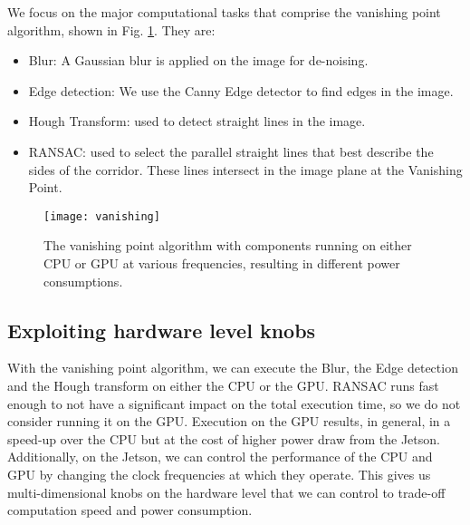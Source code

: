 We focus on the major computational tasks that comprise the vanishing point algorithm, shown in Fig. \ref{fig:vanishing}.
They are:

\begin{itemize}
\item Blur: A Gaussian blur is applied on the image for de-noising.
\item Edge detection: We use the Canny Edge detector to find edges in the image.
\item Hough Transform: used to detect straight lines in the image.
\item RANSAC: used to select the parallel straight lines that best describe the sides of the corridor. These lines intersect in the image plane at the Vanishing Point.
\end{itemize}

\begin{figure}
	\centering
	\texttt{[image: vanishing]}
	\caption{The vanishing point algorithm with components running on either CPU or GPU at various frequencies, resulting in different power consumptions.}
	\label{fig:vanishing}		
\end{figure}
\subsection{Exploiting hardware level knobs}
With the vanishing point algorithm, we can execute the Blur, the Edge detection and the Hough transform on either the CPU or the GPU. 
RANSAC runs fast enough to not have a significant impact on the total execution time, so we do not consider running it on the GPU.
Execution on the GPU results, in general, in a speed-up over the CPU but at the cost of higher power draw from the Jetson. 
Additionally, on the Jetson, we can control the performance of the CPU and GPU by changing the clock frequencies at which they operate. 
This gives us multi-dimensional knobs on the hardware level that we can control to trade-off computation speed and power consumption.




